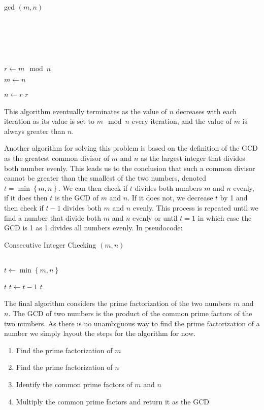 \documentclass[12pt letter]{report}
\begin{document}
\begin{algorithm}[H]
  \caption{gcd $ \left( m, n \right) $}
  \Comment{}\\
   \\
   \\
  \\
  \begin{algorithmic}[1]

    $r \gets m \mod n$

    $m \gets n$

    $n \gets r$
    \EndWhile
    \State \Return $r$
  \end{algorithmic}
\end{algorithm}

This algorithm eventually terminates as the value of $n$ decreases with each iteration as its value is set to $m \mod n$
every iteration, and the value of $m$ is always greater than $n$.

Another algorithm for solving this problem is based on the definition of the GCD as the greatest common divisor of $m$ and
$n$ as the largest integer that divides both number evenly. This leads us to the conclusion that such a common divisor
cannot be greater than the smallest of the two numbers, denoted $t = \min \left\{ m, n \right\} $. We can then check if
$t$ divides both numbers $m$ and $n$ evenly, if it does then $t$ is the GCD of $m$ and $n$. If it does not, we decrease
$t$ by 1 and then check if $t - 1$ divides both $m$ and $n$ evenly. This process is repeated until we find a number that
divide both $m$ and $n$ evenly or until $t = 1$ in which case the GCD is 1 as 1 divides all numbers evenly. In pseudocode:
\begin{algorithm}[H]
  \caption{Consecutive Integer Checking $ \left( m, n \right) $}
  \begin{algorithmic}[1] \\
    $t \gets \min \left\{ m, n \right\} $


    \State \Return $t$
    \EndIf
    \State $t \gets t - 1$
    \EndWhile
    \State \Return $t$
  \end{algorithmic}
\end{algorithm}

The final algorithm considers the prime factorization of the two numbers $m$ and $n$. The GCD of two numbers is the
product of the common prime factors of the two numbers. As there is no unambiguous way to find the prime factorization
of a number we simply layout the steps for the algorithm for now.
\begin{enumerate}
  \item Find the prime factorization of $m$
  \item Find the prime factorization of $n$
  \item Identify the common prime factors of $m$ and $n$
  \item Multiply the common prime factors and return it as the GCD
\end{enumerate}
\end{document}
